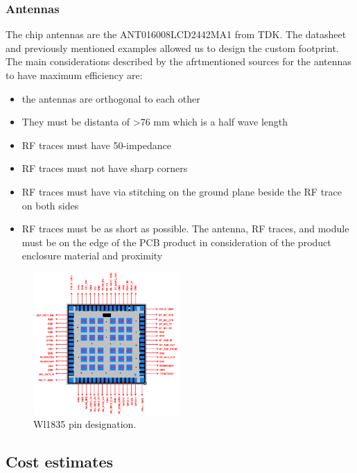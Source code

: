 \subsubsection{Antennas}
The chip antennas are the ANT016008LCD2442MA1 from TDK. The datasheet and previously mentioned examples allowed us to design the custom footprint.
The main considerations described by the afrtmentioned sources for the antennas to have maximum efficiency are:

\begin{itemize}
  \item {the antennas are orthogonal to each other}
  \item {They must be distanta of >76 mm which is a half wave length}
  \item {RF traces must have 50-\textOmega impedance}
  \item {RF traces must not have sharp corners}
  \item {RF traces must have via stitching on the ground plane beside the RF trace on both sides}
  \item {RF traces must be as short as possible. The antenna, RF traces, and module must be on the edge of the PCB product in consideration of the product enclosure material and proximity}
\end{itemize}

\begin{figure}[!htb]
    \centering
    \includegraphics[width=0.5\textwidth,keepaspectratio]{chap/hardFig/100_pin_MOC_wl1835_package}
    \caption{Wl1835 pin designation.}
    \label{fig:wl1835 pcb antennas}
\end{figure}

\subsection{Cost estimates}
